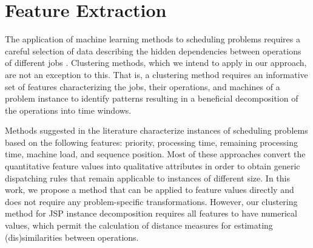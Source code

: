 \documentclass[runningheads]{llncs}
\begin{document}
\section{Feature Extraction}
\label{sec:features}
The application of machine learning methods to scheduling problems requires a careful selection of data describing the hidden dependencies between operations of different jobs \cite{ismail2012production,nasiri2019data}. Clustering methods, which we intend to apply in our approach, are not an exception to this. That is, a clustering method requires an informative set of features characterizing the jobs, their operations, and machines of a problem instance to identify patterns resulting in a beneficial decomposition of the operations into time windows. 

Methods suggested in the literature \cite{koonce2000using, harrath2002genetic, shahzad2010discovering, ismail2012production, adibi2014clustering, nasiri2019data} characterize instances of scheduling problems based on the following features: priority, processing time, remaining processing time, machine load, and sequence position. 
Most of these approaches convert the quantitative feature values %
into qualitative attributes in order to obtain generic dispatching rules
that remain applicable to instances of different size.
In this work, we propose a method that can be applied to feature values directly and does not require any problem-specific transformations. However, our clustering method for JSP instance decomposition requires all features to have numerical values, which permit the calculation of distance measures for estimating (dis)similarities between operations.
\end{document}
